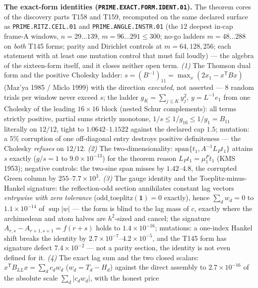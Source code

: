 \par\smallskip\noindent\textbf{The exact-form identities
(\texttt{PRIME.EXACT.FORM.IDENT.01}).}
The theorem cores of the discovery parts T158 and T159, recomputed on
the same declared surface as \texttt{PRIME.RITZ.CEIL.01} and
\texttt{PRIME.ANGLE.INSTR.01} (the $12$ deepest in-cap frame-A windows,
$n=29\ldots139$, $m=96\ldots291\le300$; no-go ladders $m=48\ldots288$ on
\emph{both} T145 forms; parity and Dirichlet controls at $m=64,128,256$;
each statement with at least one mutation control that must fail loudly)
--- the algebra of the sixteen-form itself, and it closes neither open
term. \emph{(1)} The Thomson dual form and the positive Cholesky
ladder: $s=(B^{-1})_{11}=\max_x(2x_1-x^{\mathsf T}Bx)$ (Maz'ya 1985 /
Miclo 1999) with the direction \emph{executed}, not asserted --- $8$
random trials per window never exceed $s$; the ladder
$g_K=\sum_{j\le K}y_j^2$, $y=L^{-1}e_1$ from one Cholesky of the leading
$16\times16$ block (nested Schur complements): all terms strictly
positive, partial sums strictly monotone, $1/s\le1/g_{16}\le1/g_1=
B_{11}$ literally on $12/12$, tight to $1.0642$--$1.1522$ against the
declared cap $1.5$; mutation: a $5\%$ corruption of one off-diagonal
entry destroys positive definiteness --- the Cholesky \emph{refuses} on
$12/12$. \emph{(2)} The two-dimensionality:
$\mathrm{span}\{t_1,A^{-1}L_Pt_1\}$ attains $s$ exactly ($g/s=1$ to
$9.0\times10^{-13}$) for the theorem reason $L_Pt_1=\mu^P_1t_1$ (KMS
1953); negative controls: the two-sine span misses by $1.42$--$4.8$, the
corrupted Green column by $255$--$7.7\times10^{3}$. \emph{(3)} The gauge
identity and the Toeplitz-minus-Hankel signature: the reflection-odd
section annihilates constant lag vectors \emph{entrywise with zero
tolerance} ($\mathrm{odd\_toeplitz}(\mathbf 1)=0$ exactly), hence
$\sum_dw_d=0$ to $1.1\times10^{-14}$ of $\sup|w|$ --- the form is blind
to the lag mass of $c$, exactly where the archimedean and atom halves
are $h^2$-sized and cancel; the signature $A_{r,s}-A_{r+1,s+1}=f(r+s)$
holds to $1.4\times10^{-16}$; mutations: a one-index Hankel shift breaks
the identity by $2.7\times10^{-7}$--$4.2\times10^{-5}$, and the T145
form has signature defect $7.4\times10^{-2}$ --- not a parity section,
the identity is not even defined for it. \emph{(4)} The exact lag sum
and the two closed scalars: $x^{\mathsf T}B_{LL}x=\sum_dc_dw_d$
($w_d=T_d-H_d$) against the direct assembly to $2.7\times10^{-16}$ of
the absolute scale $\sum_d|c_dw_d|$, with the honest price
